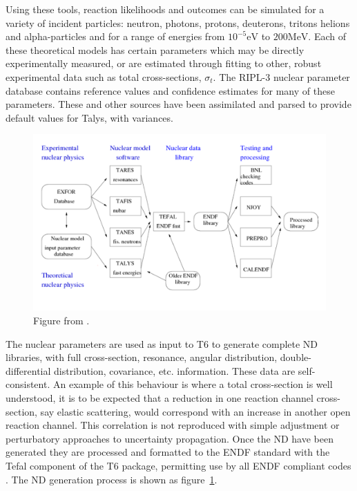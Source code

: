 Using these tools, reaction likelihoods and outcomes can be simulated for a variety of incident particles: neutron, photons, protons, deuterons, tritons helions and alpha-particles and for a range of energies from $10^{-5}\mathrm{eV}$ to $200\mathrm{MeV}$. Each of these theoretical models has certain parameters which may be directly experimentally measured, or are estimated through fitting to other, robust experimental data such as total cross-sections, $\sigma_{t}$. The RIPL-3 nuclear parameter database \cite{Capote2009} contains reference values and confidence estimates for many of these parameters. These and other sources have been assimilated and parsed to provide default values for Talys, with variances. 

\begin{figure}
  \centering
  \includegraphics[width=\textwidth]{t6_flow.png}
  \caption{Figure from \cite{Koning2013}.}
  \label{fig:t6_overview}
\end{figure}

The nuclear parameters are used as input to T6 to generate complete ND libraries, with full cross-section, resonance, angular distribution, double-differential distribution, covariance, etc. information. These data are self-consistent. An example of this behaviour is where a total cross-section is well understood, it is to be expected that a reduction in one reaction channel cross-section, say elastic scattering, would correspond with an increase in another open reaction channel. This correlation is not reproduced with simple adjustment or perturbatory approaches to uncertainty propagation. Once the ND have been generated they are processed and formatted to the ENDF standard with the Tefal component of the T6 package, permitting use by all ENDF compliant codes \cite{Koning2012}. The ND generation process is shown as figure~\ref{fig:t6_overview}.

